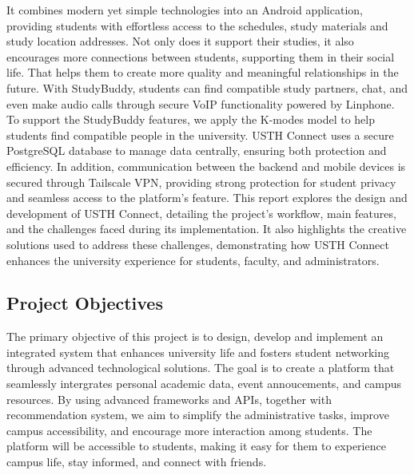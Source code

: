 \documentclass{article}
\begin{document}
It combines modern yet simple technologies into an Android application, providing students with effortless access to the schedules, study materials and study location addresses.
Not only does it support their studies, it also encourages more connections between students, supporting them in their social life. That helps them to create more quality and meaningful relationships in the future.
With StudyBuddy, students can find compatible study partners, chat, and even make audio calls through secure VoIP functionality powered by Linphone.
To support the StudyBuddy features, we apply the K-modes model to help students find compatible people in the university.
USTH Connect uses a secure PostgreSQL database to manage data centrally, ensuring both protection and efficiency.
In addition, communication between the backend and mobile devices is secured through Tailscale VPN, providing strong protection for student privacy and seamless access to the platform's feature.
This report explores the design and development of USTH Connect, detailing the project's workflow, main features, and the challenges faced during its implementation. 
It also highlights the creative solutions used to address these challenges, demonstrating how USTH Connect enhances the university experience for students, faculty, and administrators.

\subsection{Project Objectives}
The primary objective of this project is to design, develop and implement an integrated system that enhances
university life and fosters student networking through advanced technological solutions.
The goal is to create a platform that seamlessly intergrates personal academic data, event annoucements, and campus resources.
By using advanced frameworks and APIs, together with recommendation system, we aim to simplify the administrative tasks, improve campus accessibility, 
and encourage more interaction among students.
The platform will be accessible to students, making it easy for them to experience campus life, stay informed, and connect with friends.
\end{document}
